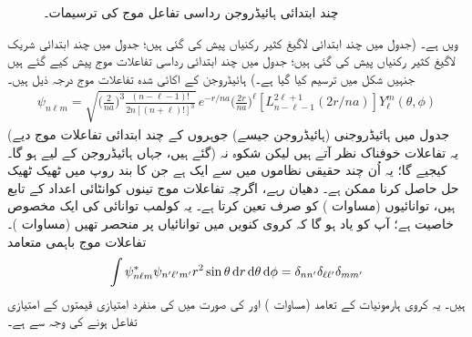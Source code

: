 \begin{figure}
\centering
{}
\caption{چند ابتدائی ہائیڈروجن رداسی تفاعل موج  کی ترسیمات۔}
\label{شکل_تین_ابعادی_چند_رداسی_تفاعل_موج_ہائیڈروجن}
\end{figure}

  ویں  ہے۔ (جدول  میں چند ابتدائی لاگیغ کثیر رکنیاں پیش کی گئی ہیں؛ جدول  میں چند ابتدائی شریک لاگیغ کثیر رکنیاں پیش کی گئی ہیں؛ جدول  میں چند ابتدائی رداسی تفاعلات موج پیش کیے گئے ہیں جنہیں شکل  میں ترسیم کیا گیا ہے۔) ہائیڈروجن کے اکائی شدہ تفاعلات موج درجہ ذیل ہیں۔
 \begin{align}\label{مساوات_تین_ابعادی_ہائیڈروجن_تفاعلات_موج}
\psi_{n\ell m}=\sqrt{\big(\frac{2}{na}\big)^3\frac{(n-\ell-1)!}{2n[(n+\ell)!]^{3}}}\,e^{-r/na}\big(\frac{2r}{na}\big)^{\ell}[L_{n-\ell-1}^{2\ell+1}(2r/na)]Y_{\ell}^{m}(\theta,\phi)
\end{align}
 (جدول  میں ہائیڈروجنی (ہائیڈروجن جیسے)  جوہروں کے  چند ابتدائی  تفاعلات موج دیے گئے ہیں،  جہاں ہائیڈروجن کے لیے  ہو گا۔) یہ تفاعلات خوفناک نظر آتے ہیں لیکن شکوہ نہ کیجیے گا؛ یہ اُن چند حقیقی نظاموں میں سے ایک ہے جن کا بند روپ میں ٹھیک ٹھیک حل حاصل کرنا ممکن ہے۔ دھیان رہے، اگرچہ تفاعلات موج تینوں کوانٹائی اعداد کے تابع ہیں، توانائیوں (مساوات ) کو صرف  تعین کرتا ہے۔ یہ کولمب توانائی کی ایک مخصوص خاصیت ہے؛ آپ کو یاد ہو گا کہ کروی کنویں میں توانائیاں  پر منحصر تھیں (مساوات )۔ تفاعلات موج باہمی متعامد 
\begin{align}
\int\psi_{n\ell m}^{*}\psi_{n'\ell'm'}r^{2}\sin\theta\dif r\dif\theta\dif\phi=\delta_{nn'}\delta_{\ell \ell'}\delta_{mm'} 
\end{align}
ہیں۔ یہ کروی ہارمونیات کے  تعامد (مساوات ) اور  کی صورت میں  کی منفرد امتیازی قیمتوں  کے امتیازی تفاعل ہونے کی وجہ سے ہے۔


